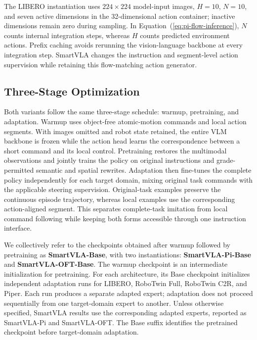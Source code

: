 The LIBERO instantiation uses $224\times224$ model-input images,
$H=10$, $N=10$, and seven active dimensions in the 32-dimensional
action container; inactive dimensions remain zero during sampling.
In Equation~(\ref{eq:pi-flow-inference}), $N$ counts internal integration steps, whereas $H$ counts
predicted environment actions. Prefix caching avoids rerunning the
vision-language backbone at every integration step. SmartVLA changes
the instruction and segment-level action supervision while retaining this
flow-matching action generator.

\subsection{Three-Stage Optimization}\label{app:training-hparams}

Both variants follow the same three-stage schedule: warmup,
pretraining, and adaptation. Warmup uses object-free atomic-motion commands and local action
segments. With images omitted and robot state retained, the entire VLM
backbone is frozen while the action head learns the correspondence between
a short command and its local control. Pretraining restores the multimodal observations and jointly
trains the policy on original instructions and grade-permitted semantic
and spatial rewrites. Adaptation then fine-tunes the
complete policy independently for each target domain, mixing original
task commands with the applicable steering supervision. Original-task
examples preserve the continuous episode trajectory, whereas local
examples use the corresponding action-aligned segment. This separates
complete-task imitation from local command following while keeping both
forms accessible through one instruction interface.

We collectively refer to the checkpoints obtained after warmup
followed by pretraining as \textbf{SmartVLA-Base}, with two instantiations:
\textbf{SmartVLA-Pi-Base} and \textbf{SmartVLA-OFT-Base}. The warmup checkpoint
is an intermediate initialization for pretraining. For each architecture, its
Base checkpoint initializes independent adaptation runs for LIBERO, RoboTwin
Full, RoboTwin C2R, and Piper. Each run produces a separate adapted expert;
adaptation does not proceed sequentially from one target-domain expert to
another. Unless otherwise specified, SmartVLA results use the corresponding
adapted experts, reported as SmartVLA-Pi and SmartVLA-OFT. The Base suffix
identifies the pretrained checkpoint before target-domain adaptation.

